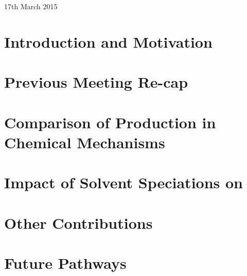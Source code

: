 \documentclass[center]{beamer}
\begin{document}


\begin{frame} %
    \vspace{3cm}
    {\Large \textcolor{\highlightcolor}{\textbf{\slidesettitle}}}\\ 
    \vspace{1cm}
    {\Large \textcolor{GreyIASS}{\textbf{\authorname}}} \\
    \vspace{.5cm}
    {\large \textcolor{GreyIASS}{17th March 2015}} 
\end{frame}



\section{Introduction and Motivation}


\section{Previous Meeting Re-cap}


\section{Comparison of  Production in Chemical Mechanisms}


\section{Impact of Solvent Speciations on }


\section{Other Contributions}


\section{Future Pathways}


\appendix
 
\end{document}
